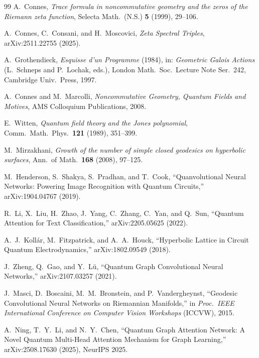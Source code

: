 \documentclass[11pt,oneside]{amsbook}
\numberwithin{equation}{section}
\theoremstyle{plain}
\theoremstyle{definition}
\theoremstyle{remark}
\begin{document}
\fi
\begin{thebibliography}{99}\setlength{\itemsep}{0.15em}
A.~Connes, \emph{Trace formula in noncommutative geometry and the zeros of the Riemann zeta function}, Selecta Math.\ (N.S.) \textbf{5} (1999), 29--106.

A.~Connes, C.~Consani, and H.~Moscovici, \emph{Zeta Spectral Triples}, arXiv:2511.22755 (2025).

A.~Grothendieck, \emph{Esquisse d'un Programme} (1984), in: \emph{Geometric Galois Actions} (L.~Schneps and P.~Lochak, eds.), London Math.\ Soc.\ Lecture Note Ser.\ 242, Cambridge Univ.\ Press, 1997.

A.~Connes and M.~Marcolli, \emph{Noncommutative Geometry, Quantum Fields and Motives}, AMS Colloquium Publications, 2008.

E.~Witten, \emph{Quantum field theory and the Jones polynomial}, Comm.\ Math.\ Phys.\ \textbf{121} (1989), 351--399.

M.~Mirzakhani, \emph{Growth of the number of simple closed geodesics on hyperbolic surfaces}, Ann.\ of Math.\ \textbf{168} (2008), 97--125.

M.~Henderson, S.~Shakya, S.~Pradhan, and T.~Cook,
\newblock ``Quanvolutional Neural Networks: Powering Image Recognition with Quantum Circuits,''
\newblock arXiv:1904.04767 (2019).

R.~Li, X.~Liu, H.~Zhao, J.~Yang, C.~Zhang, C.~Yan, and Q.~Sun,
\newblock ``Quantum Attention for Text Classification,''
\newblock arXiv:2205.05625 (2022).

A.~J.~Koll\'ar, M.~Fitzpatrick, and A.~A.~Houck,
\newblock ``Hyperbolic Lattice in Circuit Quantum Electrodynamics,''
\newblock arXiv:1802.09549 (2018).


J.~Zheng, Q.~Gao, and Y.~L\"u,
\newblock ``Quantum Graph Convolutional Neural Networks,''
\newblock arXiv:2107.03257 (2021).

J.~Masci, D.~Boscaini, M.~M.~Bronstein, and P.~Vandergheynst,
\newblock ``Geodesic Convolutional Neural Networks on Riemannian Manifolds,''
\newblock in \emph{Proc.\ IEEE International Conference on Computer Vision Workshops} (ICCVW), 2015.

A.~Ning, T.~Y.~Li, and N.~Y.~Chen,
\newblock ``Quantum Graph Attention Network: A Novel Quantum Multi-Head Attention Mechanism for Graph Learning,''
\newblock arXiv:2508.17630 (2025), NeurIPS 2025.


\end{thebibliography}
\end{document}
